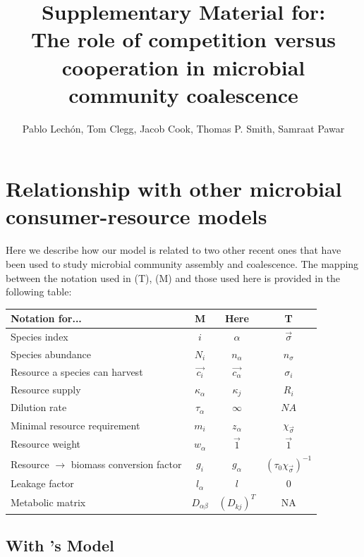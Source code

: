 \documentclass[12pt]{article}
\title{Supplementary Material for:\\The role of competition versus cooperation in microbial community coalescence}
\author{Pablo Lechón, Tom Clegg, Jacob Cook, Thomas P. Smith, Samraat Pawar}
\begin{document}
\maketitle

\tableofcontents

\newpage

\section{Relationship with other microbial consumer-resource models}

Here we describe how our model is related to two other recent ones that have been used to study microbial community assembly and coalescence. The mapping between the notation used in \cite{Tikhonov2016} (T), \cite{Marsland2019} (M) and those used here is provided in the following table:\\
\begin{center}
    \begin{tabular}{ |l|c|c|c| } 
		\hline
		Notation for... & M & Here & T \\ 
		\hline
		Species index & $ i $ & $ {\alpha} $ & $\vec{\sigma}$ \\ 
		Species abundance & $ N_i $ & $ n_{\alpha} $ & $ n_{\sigma} $ \\ 
		Resource a species can harvest & $ \vec{c_{i}} $ & $ \vec{c_{{\alpha}}} $ & $ \sigma_i $ \\ 
		Resource supply & $ \kappa_{\alpha}$ & $ \kappa_j $ & $ R_i $ \\ 
		Dilution rate & $ \tau_{\alpha} $ & $ \infty $ & $ NA $\\
		Minimal resource requirement & $ m_i $ & $ z_{\alpha} $ & $ \chi_{\vec{\sigma}} $ \\ 
		Resource weight & $ w_{\alpha} $ & $ \vec{1} $ & $\vec{1}$ \\ 
		Resource $ \rightarrow $ biomass conversion factor & $ g_i $ & $ g_{\alpha} $ & $ (\tau_0\chi_{\vec{\sigma}})^{-1} $ \\ 
		Leakage factor & $ l_{\alpha} $ & $ l $ & 0 \\
		Metabolic matrix & $ D_{\alpha\beta} $ & $ (D_{kj})^T $ & NA \\ 
		\hline
    \end{tabular}
\end{center}

\subsection*{With \cite{Marsland2019}'s Model}
\end{document}
